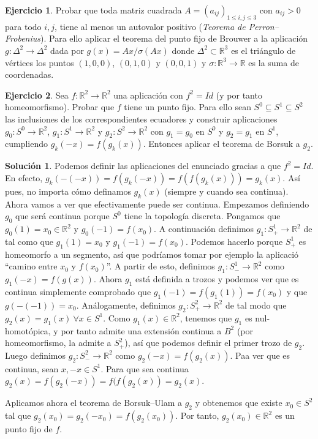\documentclass{article}
\theoremstyle{plain}
\theoremstyle{definition}
\newtheorem{exercise}{Ejercicio}
\newtheorem*{sol*}{Solución}
\newcommand{\R}{\mathbb{R}}
\begin{document}
\newpage

\begin{exercise} Probar que toda matriz cuadrada
$A= (a_{ij})_{1\le i,j\le 3}$ con $a_{ij}> 0$ para todo $i,j$, tiene al menos un
autovalor positivo
(\emph{Teorema de Perron--Frobenius}). Para ello aplicar el teorema del punto fijo de
Brouwer a la aplicaci\'on $g: \Delta^2\to \Delta^2$ dada por $g(x)= Ax/\sigma(Ax)$ donde $\Delta^2\subset \R^3$ es el tri\'angulo de
v\'ertices los puntos $(1,0,0)$, $(0,1,0)$ y $(0,0,1)$ y  $\sigma: \R^3\to \R$ es la suma de coordenadas.
\end{exercise}

\newpage

\begin{exercise}
Sea $f:\R^2\to \R^2$ una aplicaci\'on con $f^2= Id$ (y por tanto homeomorfismo). Probar que $f$ tiene un punto fijo. Para ello sean $S^0 \subseteq S^1 \subseteq S^2$ las inclusiones de los correspondientes ecuadores y construir aplicaciones $g_0: S^0 \to \R^2$, $g_1: S^1\to \mathbb{R}^2$ y $g_2: S^2\to \mathbb{R}^2$ con $g_1=g_0$ en $S^0$ y $g_2 = g_1$ en $S^1$, cumpliendo $g_k(-x) = f(g_k(x))$. Entonces aplicar el teorema de Borsuk a $g_2$.
\end{exercise}
\begin{sol*}
Podemos definir las aplicaciones del enunciado gracias a que $f^2=Id$. En efecto, $g_k(-(-x))=f(g_k(-x))=f(f(g_k(x)))=g_k(x)$. Así pues, no importa cómo definamos $g_k(x)$ (siempre y cuando sea continua). Ahora vamos a ver que efectivamente puede ser continua. Empezamos definiendo $g_0$ que será continua porque $S^0$ tiene la topología discreta. Pongamos que $g_0(1)=x_0\in\R^2$ y $g_0(-1)=f(x_0)$. A continuación definimos $g_1:S^1_+\to\R^2$ de tal como que $g_1(1)=x_0$ y $g_1(-1)=f(x_0)$. Podemos hacerlo porque $S^1_+$ es homeomorfo a un segmento, así que podríamos tomar por ejemplo la aplicació ``camino entre $x_0$ y $f(x_0)$''. A partir de esto, definimos $g_1:S^1_-\to\R^2$ como $g_1(-x)=f(g(x))$. Ahora $g_1$ está definida a trozos y podemos ver que es continua simplemente comprobado que $g_1(-1)=f(g_1(1))=f(x_0)$ y que $g(-(-1))=x_0$. Análogamente, definimos $g_2:S^2_+\to\R^2$ de tal modo que $g_2(x)=g_1(x)\ \forall x\in S^1$. Como $g_1(x)\in\R^2$, tenemos que $g_1$ es nul-homotópica, y por tanto admite una extensión continua a $B^2$ (por homeomorfismo, la admite a $S^2_+$), así que podemos definir el primer trozo de $g_2$. Luego definimos $g_2:S^2_-\to\R^2$ como $g_2(-x)=f(g_2(x))$. Paa ver que es continua, sean $x,-x\in S^1$. Para que sea continua $g_2(x)=f(g_2(-x))=f(f(g_2(x))=g_2(x)$. 

Aplicamos ahora el teorema de Borsuk--Ulam a $g_2$ y obtenemos que existe $x_0\in S^2$ tal que $g_2(x_0)=g_2(-x_0)=f(g_2(x_0))$. Por tanto, $g_2(x_0)\in\R^2$ es un punto fijo de $f$.
\end{sol*}
\end{document}
